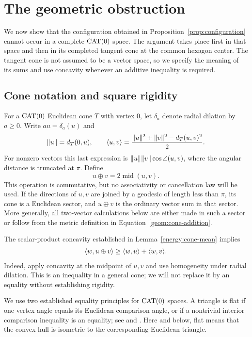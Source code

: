 \section{The geometric obstruction}
\label{sec:obstruction}

We now show that the configuration obtained in
Proposition~\ref{prop:configuration} cannot occur in a complete $\operatorname{CAT}(0)$
space.  The argument takes place first in that space and then in its
completed tangent cone at the common hexagon center.  The tangent cone
is not assumed to be a vector space, so we specify the meaning of its
sums and use concavity whenever an additive inequality is required.

\subsection{Cone notation and square rigidity}

For a $\operatorname{CAT}(0)$ Euclidean cone $T$ with vertex $0$, let $\delta_a$ denote
radial dilation by $a\geq 0$.  Write $a u=\delta_a(u)$ and
\[
 \lVert u\rVert=d_T(0,u),\qquad
 \langle u,v\rangle=\frac{\lVert u\rVert^2+\lVert v\rVert^2-d_T(u,v)^2}{2}.
\]
For nonzero vectors this last expression is
$\lVert u\rVert\lVert v\rVert\cos\angle(u,v)$, where the angular distance is
truncated at $\pi$.  Define
\begin{equation}
 u\oplus v=2\operatorname{mid}(u,v).
 \label{geom:cone-addition}
\end{equation}
This operation is commutative, but no associativity or cancellation law
will be used.  If the directions of $u,v$ are joined by a geodesic of
length less than $\pi$, its cone is a Euclidean sector, and
$u\oplus v$ is the ordinary vector sum in that sector.  More generally,
all two-vector calculations below are either made in such a sector or
follow from the metric definition in Equation~\eqref{geom:cone-addition}.

The scalar-product concavity established in Lemma~\ref{energy:cone-mean}
implies
\begin{equation}
 \langle w,u\oplus v\rangle\geq \langle w,u\rangle+\langle w,v\rangle.
 \label{geom:sum-concavity}
\end{equation}
Indeed, apply concavity at the midpoint of $u,v$ and use homogeneity
under radial dilation.  This is an inequality in a general cone; we
will not replace it by an equality without establishing rigidity.

We use two established equality principles for $\operatorname{CAT}(0)$ spaces.  A
triangle is flat if one vertex angle equals its Euclidean comparison
angle, or if a nontrivial interior comparison inequality is an
equality; see \cite[Proposition~II.2.9 and
Exercise~II.2.10(1)]{BH1999} and
\cite[Proposition~I.3.13(ii)]{Ballmann1995}.  Here and below, flat means that the
convex hull is isometric to the corresponding Euclidean triangle.

